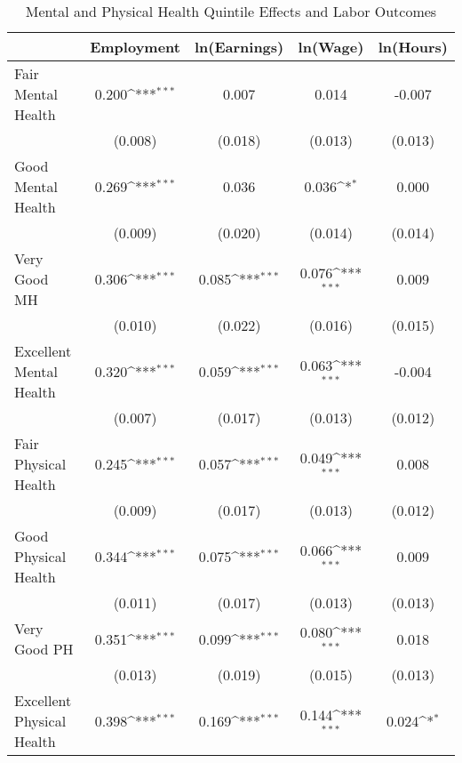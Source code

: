 \def\sym#1{\ifmmode^{#1}\else\(^{#1}\)\fi}
\begin{table}
\center\caption{Mental and Physical Health Quintile Effects and Labor Outcomes}
\footnotesize
\begin{tabular}{l*{4}{c}}
                    &\multicolumn{1}{c}{Employment}&\multicolumn{1}{c}{ln(Earnings)}&\multicolumn{1}{c}{ln(Wage)}&\multicolumn{1}{c}{ln(Hours)}\\
\midrule
Fair Mental Health  &       0.200\sym{***}&       0.007         &       0.014         &      -0.007         \\
                    &     (0.008)         &     (0.018)         &     (0.013)         &     (0.013)         \\
Good Mental Health  &       0.269\sym{***}&       0.036         &       0.036\sym{*}  &       0.000         \\
                    &     (0.009)         &     (0.020)         &     (0.014)         &     (0.014)         \\
Very Good MH        &       0.306\sym{***}&       0.085\sym{***}&       0.076\sym{***}&       0.009         \\
                    &     (0.010)         &     (0.022)         &     (0.016)         &     (0.015)         \\
Excellent Mental Health&       0.320\sym{***}&       0.059\sym{***}&       0.063\sym{***}&      -0.004         \\
                    &     (0.007)         &     (0.017)         &     (0.013)         &     (0.012)         \\
Fair Physical Health&       0.245\sym{***}&       0.057\sym{***}&       0.049\sym{***}&       0.008         \\
                    &     (0.009)         &     (0.017)         &     (0.013)         &     (0.012)         \\
Good Physical Health&       0.344\sym{***}&       0.075\sym{***}&       0.066\sym{***}&       0.009         \\
                    &     (0.011)         &     (0.017)         &     (0.013)         &     (0.013)         \\
Very Good PH        &       0.351\sym{***}&       0.099\sym{***}&       0.080\sym{***}&       0.018         \\
                    &     (0.013)         &     (0.019)         &     (0.015)         &     (0.013)         \\
Excellent Physical Health&       0.398\sym{***}&       0.169\sym{***}&       0.144\sym{***}&       0.024\sym{*}  \\

\end{tabular}
\end{table}
